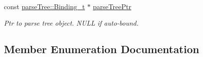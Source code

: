 \begin{DoxyCompactItemize}
const \hyperlink{structparse_tree_1_1_binding__t}{parse\+Tree\+::\+Binding\+\_\+t} $\ast$ \hyperlink{structmodel_1_1_binding__t_a8177ea0ca24e1d2636e84ffdbd1390f3}{parse\+Tree\+Ptr}
\begin{DoxyCompactList}\small\item\em Ptr to parse tree object. N\+U\+LL if auto-\/bound. \end{DoxyCompactList}\end{DoxyCompactItemize}


\subsection{Member Enumeration Documentation}
